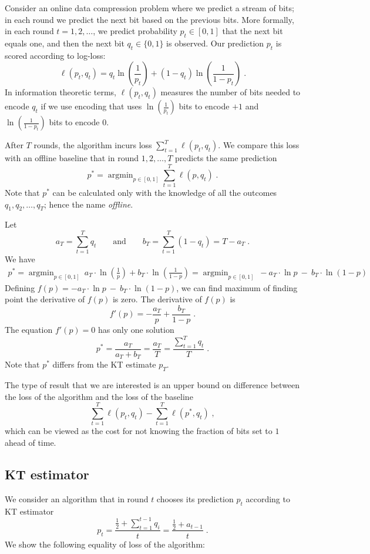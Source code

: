 \documentclass{article}
\DeclareMathOperator*{\argmin}{argmin}
\begin{document}
Consider an online data compression problem where we predict a stream of bits;
in each round we predict the next bit based on the previous bits.  More
formally, in each round $t=1,2,\dots$, we predict probability $p_t \in [0,1]$
that the next bit equals one, and then the next bit $q_t \in \{0, 1\}$ is
observed.  Our prediction $p_t$ is scored according to log-loss:
$$
\ell(p_t, q_t) = q_t \ln\left( \frac{1}{p_t}\right) + (1-q_t) \ln  \left( \frac{1}{1 - p_t} \right) \; .
$$
In information theoretic terms, $\ell(p_t, q_t)$ measures the number of bits
needed to encode $q_t$ if we use encoding that uses $\ln(\frac{1}{p_t})$ bits
to encode $+1$ and $\ln(\frac{1}{1 - p_t})$ bits to encode $0$.

After $T$ rounds, the algorithm incurs loss $\sum_{t=1}^T \ell(p_t, q_t)$.
We compare this loss with an offline baseline that in round $1,2,\dots,T$
predicts the same prediction
$$
p^* = \argmin_{p \in [0,1]} \sum_{t=1}^T \ell(p, q_t) \; .
$$
Note that $p^*$ can be calculated only with the knowledge of all the outcomes $q_1,
q_2, \dots, q_T$; hence the name \emph{offline}.

Let
$$
a_T = \sum_{t=1}^T q_t \qquad \text{and} \qquad b_T = \sum_{t=1}^T (1 - q_t) = T - a_T \; .
$$
We have
\begin{align*}
p^*
= \argmin_{p \in [0,1]} \ a_T \cdot  \ln \left( \frac{1}{p} \right) + b_T \cdot \ln \left( \frac{1}{1-p} \right)
= \argmin_{p \in [0,1]} \ - a_T \cdot  \ln p \ - \  b_T \cdot \ln (1-p)
\end{align*}
Defining $f(p) = - a_T \cdot  \ln p \ - \  b_T \cdot \ln(1-p)$, we can find maximum of
finding point the derivative of $f(p)$ is zero. The derivative of $f(p)$ is
$$
f'(p) = - \frac{a_T}{p} + \frac{b_T}{1-p} \; .
$$
The equation $f'(p) = 0$ has only one solution
$$
p^* = \frac{a_T}{a_T + b_T} = \frac{a_T}{T} = \frac{\sum_{t=1}^T q_t}{T} \; .
$$
Note that $p^*$ differs from the KT estimate $p_T$.

The type of result that we are interested is an upper bound on
difference between the loss of the algorithm and the loss of the baseline
$$
\sum_{t=1}^T \ell(p_t, q_t) - \sum_{t=1}^T \ell(p^*, q_t) \; ,
$$
which can be viewed as the cost for not knowing the fraction of bits set to $1$
ahead of time.

\subsection{KT estimator}

We consider an algorithm that in round $t$ chooses its prediction $p_t$ according to KT estimator
$$
p_t = \frac{\frac{1}{2} + \sum_{t=1}^{t-1} q_i}{t} = \frac{\frac{1}{2} + a_{t-1}}{t} \; .
$$
We show the following equality of loss of the algorithm:
\end{document}
